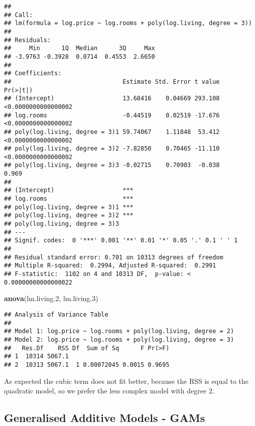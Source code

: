 \documentclass[
]{article}
\newenvironment{Shaded}{\begin{snugshade}}{\end{snugshade}}
\newcommand{\FloatTok}[1]{\textcolor[rgb]{0.00,0.00,0.81}{#1}}
\newcommand{\KeywordTok}[1]{\textcolor[rgb]{0.13,0.29,0.53}{\textbf{#1}}}
\newcommand{\NormalTok}[1]{#1}
\begin{document}
\begin{verbatim}
## 
## Call:
## lm(formula = log.price ~ log.rooms + poly(log.living, degree = 3))
## 
## Residuals:
##     Min      1Q  Median      3Q     Max 
## -3.9763 -0.3928  0.0714  0.4553  2.6650 
## 
## Coefficients:
##                               Estimate Std. Error t value            Pr(>|t|)
## (Intercept)                   13.68416    0.04669 293.108 <0.0000000000000002
## log.rooms                     -0.44519    0.02519 -17.676 <0.0000000000000002
## poly(log.living, degree = 3)1 59.74067    1.11848  53.412 <0.0000000000000002
## poly(log.living, degree = 3)2 -7.82850    0.70465 -11.110 <0.0000000000000002
## poly(log.living, degree = 3)3 -0.02715    0.70903  -0.038               0.969
##                                  
## (Intercept)                   ***
## log.rooms                     ***
## poly(log.living, degree = 3)1 ***
## poly(log.living, degree = 3)2 ***
## poly(log.living, degree = 3)3    
## ---
## Signif. codes:  0 '***' 0.001 '**' 0.01 '*' 0.05 '.' 0.1 ' ' 1
## 
## Residual standard error: 0.701 on 10313 degrees of freedom
## Multiple R-squared:  0.2994, Adjusted R-squared:  0.2991 
## F-statistic:  1102 on 4 and 10313 DF,  p-value: < 0.00000000000000022
\end{verbatim}

\begin{Shaded}
\begin{Highlighting}[]
\KeywordTok{anova}\NormalTok{(lm.living}\FloatTok{.2}\NormalTok{, lm.living}\FloatTok{.3}\NormalTok{)}
\end{Highlighting}
\end{Shaded}

\begin{verbatim}
## Analysis of Variance Table
## 
## Model 1: log.price ~ log.rooms + poly(log.living, degree = 2)
## Model 2: log.price ~ log.rooms + poly(log.living, degree = 3)
##   Res.Df    RSS Df  Sum of Sq      F Pr(>F)
## 1  10314 5067.1                            
## 2  10313 5067.1  1 0.00072045 0.0015 0.9695
\end{verbatim}

As expected the cubic term does not fit better, because the RSS is equal
to the quadratic model, so we prefer the less complex model with degree
2.

\hypertarget{generalised-additive-models---gams}{%
\subsection{Generalised Additive Models -
GAMs}\label{generalised-additive-models---gams}}
\end{document}
